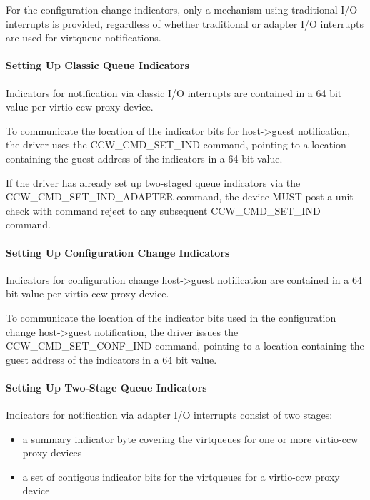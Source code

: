 For the configuration change indicators, only a mechanism using
traditional I/O interrupts is provided, regardless of whether
traditional or adapter I/O interrupts are used for virtqueue
notifications.

\paragraph{Setting Up Classic Queue Indicators}\label{sec:Virtio Transport Options / Virtio over channel I/O / Device Initialization / Setting Up Indicators / Setting Up Classic Queue Indicators}

Indicators for notification via classic I/O interrupts are contained
in a 64 bit value per virtio-ccw proxy device.

To communicate the location of the indicator bits for host->guest
notification, the driver uses the CCW_CMD_SET_IND command,
pointing to a location containing the guest address of the
indicators in a 64 bit value.

If the driver has already set up two-staged queue indicators via the
CCW_CMD_SET_IND_ADAPTER command, the device MUST post a unit check
with command reject to any subsequent CCW_CMD_SET_IND command.

\paragraph{Setting Up Configuration Change Indicators}\label{sec:Virtio Transport Options / Virtio over channel I/O / Device Initialization / Setting Up Indicators / Setting Up Configuration Change Indicators}

Indicators for configuration change host->guest notification are
contained in a 64 bit value per virtio-ccw proxy device.

To communicate the location of the indicator bits used in the
configuration change host->guest notification, the driver issues the
CCW_CMD_SET_CONF_IND command, pointing to a location containing the
guest address of the indicators in a 64 bit value.

\paragraph{Setting Up Two-Stage Queue Indicators}\label{sec:Virtio Transport Options / Virtio over channel I/O / Device Initialization / Setting Up Indicators / Setting Up Two-Stage Queue Indicators}

Indicators for notification via adapter I/O interrupts consist of
two stages:
\begin{itemize}
\item a summary indicator byte covering the virtqueues for one or more
  virtio-ccw proxy devices
\item a set of contigous indicator bits for the virtqueues for a
  virtio-ccw proxy device
\end{itemize}

